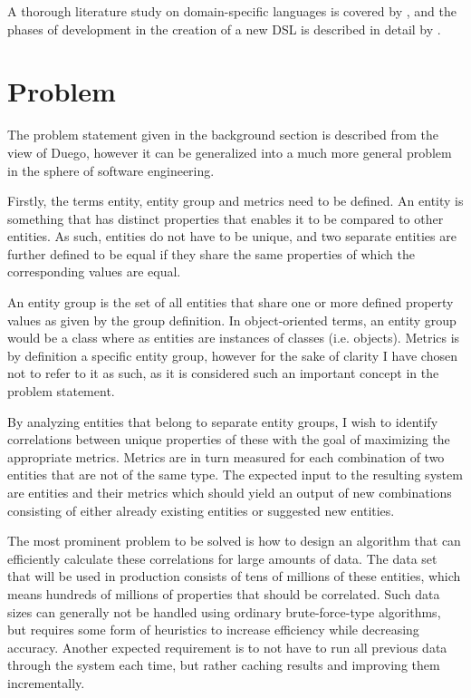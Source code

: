 \documentclass[a4paper]{article}
\begin{document}
A thorough literature study on domain-specific languages is covered by \citet{Deursen2000}, and the phases of development in the creation of a new DSL is described in detail by \citet{Mernik2005}.

\section{Problem}
The problem statement given in the background section is described from the view of Duego, however it can be generalized into a much more general problem in the sphere of software engineering.

Firstly, the terms entity, entity group and metrics need to be defined. An entity is something that has distinct properties that enables it to be compared to other entities. As such, entities do not have to be unique, and two separate entities are further defined to be equal if they share the same properties of which the corresponding values are equal.

An entity group is the set of all entities that share one or more defined property values as given by the group definition. In object-oriented terms, an entity group would be a class where as entities are instances of classes (i.e. objects). Metrics is by definition a specific entity group, however for the sake of clarity I have chosen not to refer to it as such, as it is considered such an important concept in the problem statement.

By analyzing entities that belong to separate entity groups, I wish to identify correlations between unique properties of these with the goal of maximizing the appropriate metrics. Metrics are in turn measured for each combination of two entities that are not of the same type. The expected input to the resulting system are entities and their metrics which should yield an output of new combinations consisting of either already existing entities or suggested new entities.

The most prominent problem to be solved is how to design an algorithm that can efficiently calculate these correlations for large amounts of data. The data set that will be used in production consists of tens of millions of these entities, which means hundreds of millions of properties that should be correlated. Such data sizes can generally not be handled using ordinary brute-force-type algorithms, but requires some form of heuristics to increase efficiency while decreasing accuracy. Another expected requirement is to not have to run all previous data through the system each time, but rather caching results and improving them incrementally.
\end{document}
